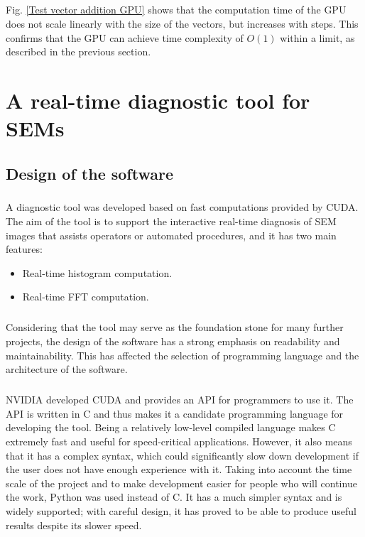 \documentclass[12pt, twocolumn]{report}
\begin{document}
\paragraph{}
Fig. \ref{Test vector addition GPU} shows that the computation time of the GPU does not scale linearly with the size of the vectors, but increases with steps. This confirms that the GPU can achieve time complexity of $O(1)$ within a limit, as described in the previous section.

\chapter{A real-time diagnostic tool for SEMs}
\section{Design of the software}
\paragraph{}
A diagnostic tool was developed based on fast computations provided by CUDA. The aim of the tool is to support the interactive real-time diagnosis of SEM images that assists operators or automated procedures, and it has two main features:
\begin{itemize}
    \item Real-time histogram computation.
    \item Real-time FFT computation.
\end{itemize}

\paragraph{}
Considering that the tool may serve as the foundation stone for many further projects, the design of the software has a strong emphasis on readability and maintainability. This has affected the selection of programming language and the architecture of the software.

\paragraph{}
NVIDIA developed CUDA and provides an API for programmers to use it. The API is written in C and thus makes it a candidate programming language for developing the tool. Being a relatively low-level compiled language makes C extremely fast and useful for speed-critical applications. However, it also means that it has a complex syntax, which could significantly slow down development if the user does not have enough experience with it. Taking into account the time scale of the project and to make development easier for people who will continue the work, Python was used instead of C. It has a much simpler syntax and is widely supported; with careful design, it has proved to be able to produce useful results despite its slower speed.
\end{document}
